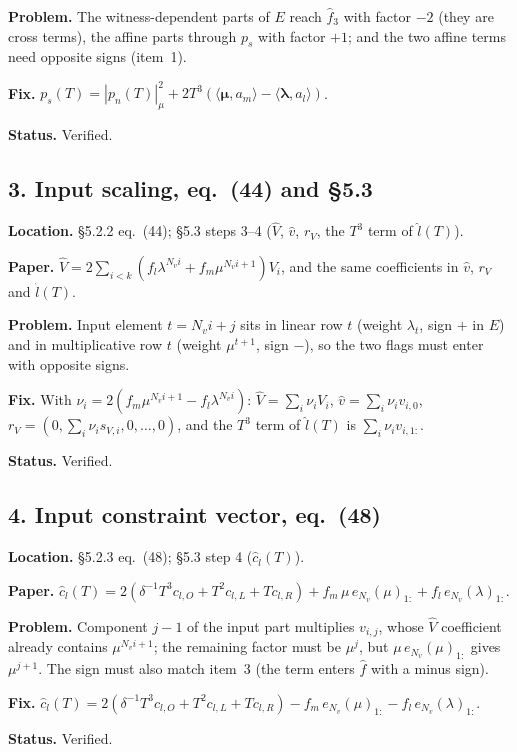 \documentclass[11pt,a4paper]{article}
\newcommand{\bmu}{\boldsymbol{\mu}}
\newcommand{\blam}{\boldsymbol{\lambda}}
\newcommand{\status}[1]{\par\noindent\textbf{Status.} #1}
\newcommand{\loc}[1]{\par\noindent\textbf{Location.} #1}
\begin{document}
\noindent\textbf{Problem.} The witness-dependent parts of $E$ reach $\hat f_3$ with factor
$-2$ (they are cross terms), the affine parts through $p_s$ with factor $+1$; and the two affine
terms need opposite signs (item~1).

\noindent\textbf{Fix.}
$p_s(T) = |p_n(T)|^2_\mu + 2T^3\left(\langle \bmu, a_m\rangle - \langle \blam, a_l\rangle\right)$.
\status{Verified.}

\subsection*{3. Input scaling, eq.\ (44) and \S5.3}
\loc{\S5.2.2 eq.~(44); \S5.3 steps 3--4 ($\hat V$, $\hat v$, $r_V$, the $T^3$ term of
$\hat l(T)$).}

\noindent\textbf{Paper.} $\hat V = 2\sum_{i<k}(f_l \lambda^{N_v i} + f_m \mu^{N_v i + 1}) V_i$,
and the same coefficients in $\hat v$, $r_V$ and $\hat l(T)$.

\noindent\textbf{Problem.} Input element $t = N_v i + j$ sits in linear row $t$ (weight
$\lambda_t$, sign $+$ in $E$) and in multiplicative row $t$ (weight $\mu^{t+1}$, sign $-$), so the
two flags must enter with opposite signs.

\noindent\textbf{Fix.} With $\nu_i = 2\left(f_m \mu^{N_v i + 1} - f_l \lambda^{N_v i}\right)$:
$\hat V = \sum_i \nu_i V_i$, $\hat v = \sum_i \nu_i v_{i,0}$,
$r_V = (0, \sum_i \nu_i s_{V,i}, 0, \dots, 0)$, and the $T^3$ term of $\hat l(T)$ is
$\sum_i \nu_i v_{i,1:}$.
\status{Verified.}

\subsection*{4. Input constraint vector, eq.\ (48)}
\loc{\S5.2.3 eq.~(48); \S5.3 step 4 ($\hat c_l(T)$).}

\noindent\textbf{Paper.} $\hat c_l(T) = 2(\delta^{-1}T^3 c_{l,O} + T^2 c_{l,L} + T c_{l,R})
+ f_m\, \mu\, e_{N_v}(\mu)_{1:} + f_l\, e_{N_v}(\lambda)_{1:}$.

\noindent\textbf{Problem.} Component $j-1$ of the input part multiplies $v_{i,j}$, whose
$\hat V$ coefficient already contains $\mu^{N_v i + 1}$; the remaining factor must be $\mu^j$,
but $\mu\, e_{N_v}(\mu)_{1:}$ gives $\mu^{j+1}$. The sign must also match item~3 (the term
enters $\hat f$ with a minus sign).

\noindent\textbf{Fix.} $\hat c_l(T) = 2(\delta^{-1}T^3 c_{l,O} + T^2 c_{l,L} + T c_{l,R})
- f_m\, e_{N_v}(\mu)_{1:} - f_l\, e_{N_v}(\lambda)_{1:}$.
\status{Verified.}
\end{document}
